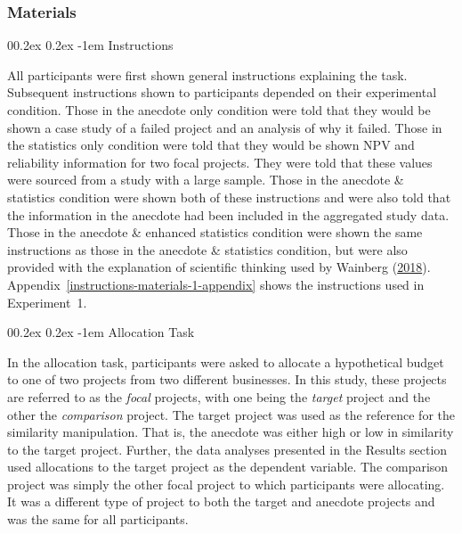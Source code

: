 \documentclass[
  man, donotrepeattitle,floatsintext]{apa7}
\makeatletter
\let\oldparagraph\paragraph
\renewcommand{\paragraph}[1]{\oldparagraph{#1}\mbox{}}
\renewcommand{\paragraph}{\@startsection{paragraph}{4}{\parindent}%
  {0\baselineskip \@plus 0.2ex \@minus 0.2ex}%
  {-1em}%
  {\normalfont\normalsize\bfseries\itshape\typesectitle}}
\theoremstyle{definition}
\theoremstyle{definition}
\theoremstyle{definition}
\theoremstyle{definition}
\theoremstyle{remark}
\makeatother
\begin{document}
\hypertarget{materials-1}{%
\subsubsection{Materials}\label{materials-1}}

\hypertarget{instructions-materials-1}{%
\paragraph{Instructions}\label{instructions-materials-1}}

All participants were first shown general instructions explaining the task.
Subsequent instructions shown to participants depended on their experimental
condition. Those in the anecdote only condition were told that they would be
shown a case study of a failed project and an analysis of why it failed. Those
in the statistics only condition were told that they would be shown NPV and
reliability information for two focal projects. They were told that these values
were sourced from a study with a large sample. Those in the anecdote \&
statistics condition were shown both of these instructions and were also told
that the information in the anecdote had been included in the aggregated study
data. Those in the anecdote \& enhanced statistics condition were shown the same
instructions as those in the anecdote \& statistics condition, but were also
provided with the explanation of scientific thinking used by Wainberg (\protect\hyperlink{ref-wainberg2018}{2018}).
Appendix~\ref{instructions-materials-1-appendix} shows the
instructions used in Experiment~1.

\hypertarget{allocation-task}{%
\paragraph{Allocation Task}\label{allocation-task}}

In the allocation task, participants were asked to allocate a hypothetical
budget to one of two projects from two different businesses. In this study,
these projects are referred to as the \emph{focal} projects, with one being the
\emph{target} project and the other the \emph{comparison} project. The target project was
used as the reference for the similarity manipulation. That is, the anecdote was
either high or low in similarity to the target project. Further, the data
analyses presented in the Results section used allocations to the target project
as the dependent variable. The comparison project was simply the other focal
project to which participants were allocating. It was a different type of
project to both the target and anecdote projects and was the same for all
participants.
\end{document}
